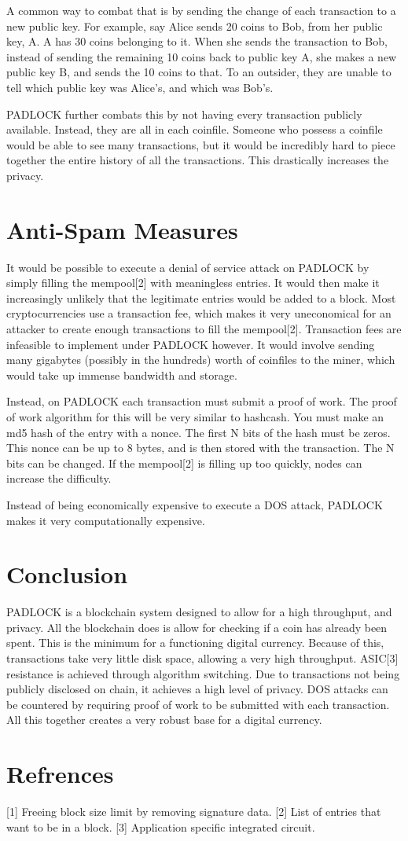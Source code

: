 \documentclass[12pt, letterpaper]{article}
\begin{document}
A common way to combat that is by sending the change of each transaction to a new
public key. For example, say Alice sends 20 coins to Bob, from her public key, A.
A has 30 coins belonging to it. When she sends the transaction to Bob, instead
of sending the remaining 10 coins back to public key A, she makes a new public
key B, and sends the 10 coins to that. To an outsider, they are unable to tell
which public key was Alice's, and which was Bob's.

PADLOCK further combats this by not having every transaction publicly available.
Instead, they are all in each coinfile. Someone who possess a coinfile would be
able to see many transactions, but it would be incredibly hard to piece together
the entire history of all the transactions. This drastically increases the
privacy.


\section{Anti-Spam Measures}
It would be possible to execute a denial of service attack on PADLOCK by simply
filling the mempool[2] with
meaningless entries. It would then make it increasingly unlikely that the
legitimate entries would be added to a block. Most cryptocurrencies use a
transaction fee, which makes it very uneconomical for an attacker to create
enough transactions to fill the mempool[2]. Transaction fees are infeasible to
implement under PADLOCK however. It would involve sending many gigabytes
(possibly in the hundreds) worth of coinfiles to the miner, which would take up
immense bandwidth and storage.

Instead, on PADLOCK each transaction must submit a proof of work. The proof of
work algorithm for this will be very similar to hashcash. You must make an md5
hash of the entry with a nonce. The first N bits of the hash must be zeros. This
nonce can be up to 8 bytes, and is then stored with the transaction. The N bits
can be changed. If the mempool[2] is filling up too quickly, nodes can increase the
difficulty.

Instead of being economically expensive to execute a DOS attack, PADLOCK makes
it very computationally expensive.


\section{Conclusion}
PADLOCK is a blockchain system designed to allow for a high throughput, and
privacy. All the blockchain does is allow for checking
if a coin has already been spent. This is the minimum for a functioning
digital currency. Because of this, transactions take very little disk space,
allowing a very high throughput. ASIC[3] resistance is achieved through algorithm
switching. Due to transactions not being publicly disclosed on chain, it
achieves a high level of privacy. DOS attacks can be countered by requiring
proof of work to be submitted with each transaction. All this together creates a very robust base for a digital currency.

\section{Refrences}

[1] Freeing block size limit by removing signature data. \newline{}
[2] List of entries that want to be in a block. \newline{}
[3] Application specific integrated circuit. \newline{}
\end{document}

